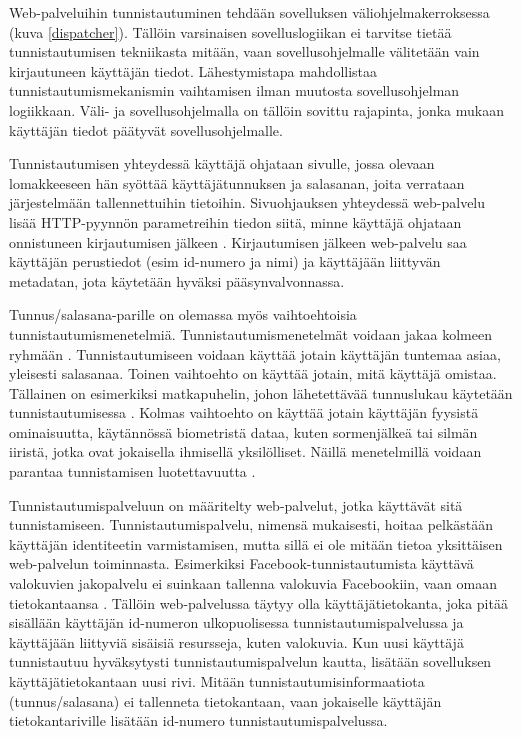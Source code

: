 Web-palveluihin tunnistautuminen tehdään sovelluksen väliohjelmakerroksessa (kuva \ref{dispatcher}). Tällöin varsinaisen sovelluslogiikan ei tarvitse tietää tunnistautumisen tekniikasta mitään, vaan sovellusohjelmalle välitetään vain kirjautuneen käyttäjän tiedot. Lähestymistapa mahdollistaa tunnistautumismekanismin vaihtamisen ilman muutosta sovellusohjelman logiikkaan. Väli- ja sovellusohjelmalla on tällöin sovittu rajapinta, jonka mukaan käyttäjän tiedot päätyvät sovellusohjelmalle.

Tunnistautumisen yhteydessä käyttäjä ohjataan sivulle, jossa olevaan lomakkeeseen hän syöttää käyttäjätunnuksen ja salasanan, joita verrataan järjestelmään tallennettuihin tietoihin. Sivuohjauksen yhteydessä web-palvelu lisää HTTP-pyynnön parametreihin tiedon siitä, minne käyttäjä ohjataan onnistuneen kirjautumisen jälkeen \cite{oauth2_0}. Kirjautumisen jälkeen web-palvelu saa käyttäjän perustiedot (esim id-numero ja nimi) ja käyttäjään liittyvän metadatan, jota käytetään hyväksi pääsynvalvonnassa.

Tunnus/salasana-parille on olemassa myös vaihtoehtoisia tunnistautumismenetelmiä. Tunnistautumismenetelmät voidaan jakaa kolmeen ryhmään \cite{nisti}. Tunnistautumiseen voidaan käyttää jotain käyttäjän tuntemaa asiaa, yleisesti salasanaa. Toinen vaihtoehto on käyttää jotain, mitä käyttäjä omistaa. Tällainen on esimerkiksi matkapuhelin, johon lähetettävää tunnuslukau käytetään tunnistautumisessa \cite{5336918}. Kolmas vaihtoehto on käyttää jotain käyttäjän fyysistä ominaisuutta, käytännössä biometristä dataa, kuten sormenjälkeä tai silmän iiristä, jotka ovat jokaisella ihmisellä yksilölliset. Näillä menetelmillä voidaan parantaa tunnistamisen luotettavuutta \cite{nisti}.

Tunnistautumispalveluun on määritelty web-palvelut, jotka käyttävät sitä tunnistamiseen. Tunnistautumispalvelu, nimensä mukaisesti, hoitaa pelkästään käyttäjän identiteetin varmistamisen, mutta sillä ei ole mitään tietoa yksittäisen web-palvelun toiminnasta. Esimerkiksi Facebook-tunnistautumista käyttävä valokuvien jakopalvelu ei suinkaan tallenna valokuvia Facebookiin, vaan omaan tietokantaansa \cite{web_resources}. Tällöin web-palvelussa täytyy olla käyttäjätietokanta, joka pitää sisällään käyttäjän id-numeron ulkopuolisessa tunnistautumispalvelussa ja käyttäjään liittyviä sisäisiä resursseja, kuten valokuvia. Kun uusi käyttäjä tunnistautuu hyväksytysti tunnistautumispalvelun kautta, lisätään sovelluksen käyttäjätietokantaan uusi rivi. Mitään tunnistautumisinformaatiota (tunnus/salasana) ei tallenneta tietokantaan, vaan jokaiselle käyttäjän tietokantariville lisätään id-numero tunnistautumispalvelussa.